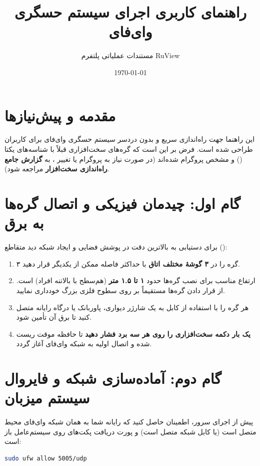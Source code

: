 \documentclass[12pt,a4paper]{article}
\title{\textbf{راهنمای کاربری اجرای سیستم حسگری وای‌فای \lr{(WiFi Sensing Quick Start)}}}
\author{مستندات عملیاتی پلتفرم RuView}
\date{\today}
\begin{document}
\maketitle

\section{مقدمه و پیش‌نیازها}
این راهنما جهت راه‌اندازی سریع و بدون دردسر سیستم حسگری وای‌فای برای کاربران طراحی شده است. فرض بر این است که گره‌های سخت‌افزاری  قبلاً با شناسه‌های یکتا () و  مشخص پروگرام شده‌اند (در صورت نیاز به پروگرام یا تغییر ، به \textbf{گزارش جامع راه‌اندازی سخت‌افزار} مراجعه شود).

\section{گام اول: چیدمان فیزیکی و اتصال گره‌ها به برق}
برای دستیابی به بالاترین دقت در پوشش فضایی و ایجاد شبکه دید متقاطع ():
\begin{enumerate}
    \item ۳ گره  را در \textbf{۳ گوشهٔ مختلف اتاق} با حداکثر فاصله ممکن از یکدیگر قرار دهید.
    \item ارتفاع مناسب برای نصب گره‌ها حدود \textbf{۱ تا ۱.۵ متر} (هم‌سطح با بالاتنه افراد) است. از قرار دادن گره‌ها مستقیماً بر روی سطوح فلزی بزرگ خودداری نمایید.
    \item هر گره را با استفاده از کابل  به یک شارژر دیواری، پاوربانک یا درگاه رایانه متصل کنید تا برق آن تأمین شود.
    \item \textbf{یک بار دکمه سخت‌افزاری  را روی هر سه برد فشار دهید} تا حافظه موقت ریست شده و اتصال اولیه به شبکه وای‌فای آغاز گردد.
\end{enumerate}

\section{گام دوم: آماده‌سازی شبکه و فایروال سیستم میزبان}
پیش از اجرای سرور، اطمینان حاصل کنید که رایانه شما به همان شبکه وای‌فای محیط متصل است (یا کابل شبکه متصل است) و پورت دریافت پکت‌های  روی سیستم‌عامل باز است:

\begin{latin}
\begin{lstlisting}[language=bash]
sudo ufw allow 5005/udp
\end{lstlisting}
\end{latin}
\end{document}
